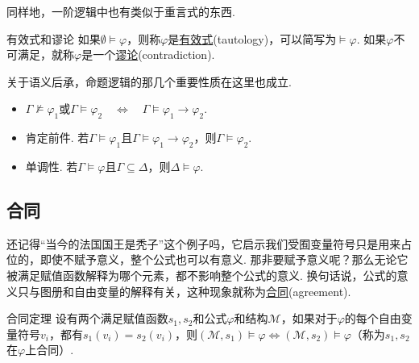\documentclass[main.tex]{subfiles}
\begin{document}
同样地，一阶逻辑中也有类似于重言式的东西.
\begin{definition}{有效式和谬论}
    如果\(\emptyset \vDash \varphi\)，则称\(\varphi\)是\uline{有效式}(tautology)，可以简写为\(\vDash \varphi\). 如果\(\varphi\)不可满足，就称\(\varphi\)是一个\uline{谬论}(contradiction).
\end{definition}

关于语义后承，命题逻辑的那几个重要性质在这里也成立.
\begin{itemize}
    \item \(\Gamma \not \vDash \varphi_1 \mbox{或} \Gamma \vDash \varphi_2 \quad \Longleftrightarrow \quad \Gamma \vDash \varphi_1 \to \varphi_2\).
    \item 肯定前件. 若\(\Gamma \vDash \varphi_1\)且\(\Gamma \vDash \varphi_1 \to \varphi_2\)，则\(\Gamma \vDash \varphi_2\).
    \item 单调性. 若\(\Gamma \vDash \varphi\)且\(\Gamma \subseteq \Delta\)，则\(\Delta \vDash \varphi\).
\end{itemize}


\subsection{合同}

还记得“当今的法国国王是秃子”这个例子吗，它启示我们受囿变量符号只是用来占位的，即使不赋予意义，整个公式也可以有意义. 那非要赋予意义呢？那么无论它被满足赋值函数解释为哪个元素，都不影响整个公式的意义. 换句话说，公式的意义只与图册和自由变量的解释有关，这种现象就称为\uline{合同}(agreement).

\begin{theorem}{合同定理}
    设有两个满足赋值函数\(s_1, s_2\)和公式\(\varphi\)和结构\(\mathcal{M}\)，如果对于\(\varphi\)的每个自由变量符号\(v_i\)，都有\(s_1(v_i)=s_2(v_i)\)，则\((\mathcal{M},s_1) \vDash \varphi \Longleftrightarrow (\mathcal{M},s_2) \vDash \varphi\)（称为\(s_1,s_2\)在\(\varphi\)上合同）.
\end{theorem}
\end{document}
